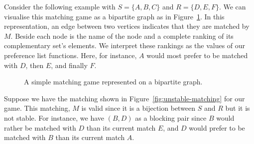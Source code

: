 \begin{example}\label{example:matching}
    Consider the following example with \(S = \{A, B, C\}\) and \(R = \{D, E,
    F\}\). We can visualise this matching game as a bipartite graph as in
    Figure~\ref{fig:matching-bipartite}. In this representation, an edge between
    two vertices indicates that they are matched by \(M\). Beside each node is 
    the name of the node and a complete ranking of its complementary set's 
    elements. We interpret these rankings as the values of our preference list 
    functions. Here, for instance, \(A\) would most prefer to be matched with 
    \(D\), then \(E\), and finally \(F\).\\
    
    \begin{figure}[h]
    \centering
    \caption{A simple matching game represented on a bipartite 
    graph.}\label{fig:matching-bipartite}
    \end{figure}

    Suppose we have the matching shown in Figure~\ref{fig:unstable-matching} for
    our game. This matching, \(M\) is valid since it is a bijection between 
    \(S\) and \(R\) but it is not stable. For instance, we have \((B, D)\) as a
    blocking pair since \(B\) would rather be matched with \(D\) than its 
    current match \(E\), and \(D\) would prefer to be matched with \(B\) than
    its current match \(A\).\\


\end{example}
